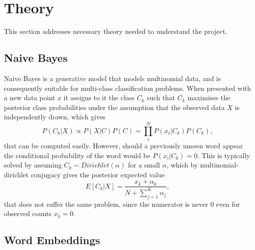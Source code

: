 \chapter{Theory}
This section addresses necessary theory needed to understand the project.

\section{Naive Bayes}
Naive Bayes is a generative model that models multinomial data, and is consequently suitable for multi-class classification problems. When presented with a new data point $x$ it assigns to it the class $C_k$ such that $C_k$ maximises the posterior class probabilities under the assumption that the observed data $X$ is independently drawn, which gives
\begin{equation}
    P(C_k | X) \propto P(X | C)P(C) = \prod_{i}^{N}P(x_{i}|C_{k})P(C_{k}), 
\end{equation}
that can be computed easily. However, should a previously unseen word appear the conditional probability of the word would be $P(x_i|C_k)=0$. This is typically solved by assuming $C_{k} \sim Dirichlet(\alpha)$ for a small $\alpha$, which by multinomial-dirichlet conjugacy gives the posterior expected value
\begin{equation}
  E[C_{k} | X] = \frac{x_{k}+ \alpha_{k}}{N + \sum_{j=1}^{K}\alpha_{j}},
\end{equation}
that does not suffer the same problem, since the numerator is never $0$ even for observed counts $x_{k} = 0$.

\section{Word Embeddings}

